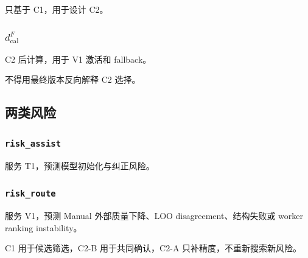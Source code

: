 只基于 C1，用于设计 C2。

\subsubsection{\texorpdfstring{\(d_{\text{cal}}^F\)}{dcal-F}}

C2 后计算，用于 V1 激活和 fallback。

不得用最终版本反向解释 C2 选择。

\subsection{两类风险}

\subsubsection{\texttt{risk\_assist}}

服务 T1，预测模型初始化与纠正风险。

\subsubsection{\texttt{risk\_route}}

服务 V1，预测 Manual 外部质量下降、LOO disagreement、结构失败或 worker ranking instability。

C1 用于候选筛选，C2-B 用于共同确认，C2-A 只补精度，不重新搜索新风险。
